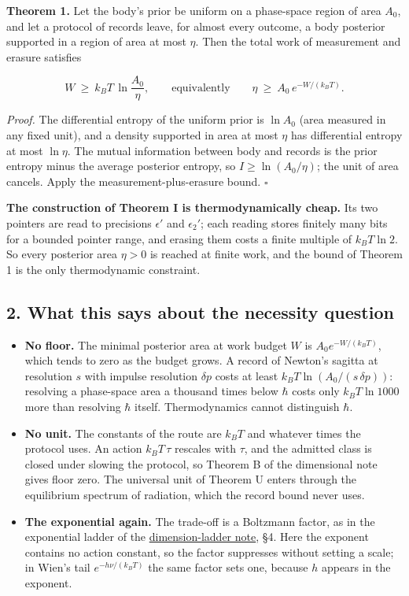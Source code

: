 \documentclass[11pt,a4paper]{article}
\newcommand{\tightlist}{\setlength{\itemsep}{0pt}\setlength{\parskip}{0pt}}
\begin{document}
\textbf{Theorem 1.} Let the body's prior be uniform on a phase-space
region of area \(A_0\), and let a protocol of records leave, for almost
every outcome, a body posterior supported in a region of area at most
\(\eta\). Then the total work of measurement and erasure satisfies

\[W\ \ge\ k_BT\,\ln\frac{A_0}{\eta},\qquad\text{equivalently}\qquad
\eta\ \ge\ A_0\,e^{-W/(k_BT)}.\]

\emph{Proof.} The differential entropy of the uniform prior is
\(\ln A_0\) (area measured in any fixed unit), and a density supported
in area at most \(\eta\) has differential entropy at most \(\ln\eta\).
The mutual information between body and records is the prior entropy
minus the average posterior entropy, so \(I\ge\ln(A_0/\eta)\); the unit
of area cancels. Apply the measurement-plus-erasure bound. \(\square\)

\textbf{The construction of Theorem I is thermodynamically cheap.} Its
two pointers are read to precisions \(\epsilon'\) and \(\epsilon_2'\);
each reading stores finitely many bits for a bounded pointer range, and
erasing them costs a finite multiple of \(k_BT\ln2\). So every posterior
area \(\eta>0\) is reached at finite work, and the bound of Theorem 1 is
the only thermodynamic constraint.

\hypertarget{what-this-says-about-the-necessity-question}{%
\subsection{2. What this says about the necessity
question}\label{what-this-says-about-the-necessity-question}}

\begin{itemize}
\tightlist
\item
  \textbf{No floor.} The minimal posterior area at work budget \(W\) is
  \(A_0e^{-W/(k_BT)}\), which tends to zero as the budget grows. A
  record of Newton's sagitta at resolution \(s\) with impulse resolution
  \(\delta p\) costs at least \(k_BT\ln(A_0/(s\,\delta p))\): resolving
  a phase-space area a thousand times below \(\hbar\) costs only
  \(k_BT\ln1000\) more than resolving \(\hbar\) itself. Thermodynamics
  cannot distinguish \(\hbar\).
\item
  \textbf{No unit.} The constants of the route are \(k_BT\) and whatever
  times the protocol uses. An action \(k_BT\,\tau\) rescales with
  \(\tau\), and the admitted class is closed under slowing the protocol,
  so Theorem B of the dimensional note gives floor zero. The universal
  unit of Theorem U enters through the equilibrium spectrum of
  radiation, which the record bound never uses.
\item
  \textbf{The exponential again.} The trade-off is a Boltzmann factor,
  as in the exponential ladder of the
  \href{dimension-ladder.md}{dimension-ladder note}, §4. Here the
  exponent contains no action constant, so the factor suppresses without
  setting a scale; in Wien's tail \(e^{-h\nu/(k_BT)}\) the same factor
  sets one, because \(h\) appears in the exponent.
\end{itemize}
\end{document}
